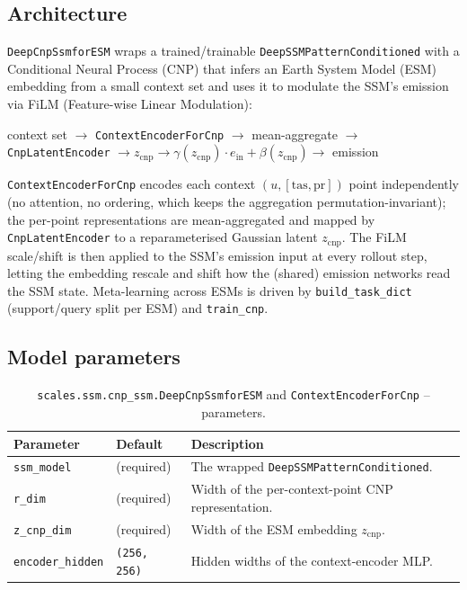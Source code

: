\documentclass[11pt]{article}
\begin{document}
\subsection{Architecture}

\texttt{DeepCnpSsmforESM} wraps a trained/trainable
\texttt{DeepSSMPatternConditioned} with a Conditional Neural Process (CNP)
that infers an Earth System Model (ESM) embedding from a small context set
and uses it to modulate the SSM's emission via FiLM (Feature-wise Linear
Modulation):

\begin{center}
context set $\to$ \texttt{ContextEncoderForCnp} $\to$ mean-aggregate $\to$
\texttt{CnpLatentEncoder} $\to z_{\mathrm{cnp}}
\to \gamma(z_{\mathrm{cnp}})\cdot e_{\mathrm{in}} + \beta(z_{\mathrm{cnp}}) \to$ emission
\end{center}

\texttt{ContextEncoderForCnp} encodes each context $(u, [\mathrm{tas},
\mathrm{pr}])$ point independently (no attention, no ordering, which keeps
the aggregation permutation-invariant); the per-point representations are
mean-aggregated and mapped by \texttt{CnpLatentEncoder} to a reparameterised
Gaussian latent $z_{\mathrm{cnp}}$. The FiLM scale/shift is then applied to
the SSM's emission input at every rollout step, letting the embedding
rescale and shift how the (shared) emission networks read the SSM state.
Meta-learning across ESMs is driven by \texttt{build\_task\_dict} (support/query
split per ESM) and \texttt{train\_cnp}.

\subsection{Model parameters}

\begin{table}[h]
\centering
\caption{\texttt{scales.ssm.cnp\_ssm.DeepCnpSsmforESM} and \texttt{ContextEncoderForCnp} -- parameters.}
\begin{tabular}{@{}llL{7cm}@{}}
\toprule
Parameter & Default & Description \\
\midrule
\texttt{ssm\_model}     & (required) & The wrapped \texttt{DeepSSMPatternConditioned}. \\
\texttt{r\_dim}         & (required) & Width of the per-context-point CNP representation. \\
\texttt{z\_cnp\_dim}    & (required) & Width of the ESM embedding $z_{\mathrm{cnp}}$. \\
\texttt{encoder\_hidden}& \texttt{(256, 256)} & Hidden widths of the context-encoder MLP. \\
\bottomrule
\end{tabular}
\end{table}
\end{document}
